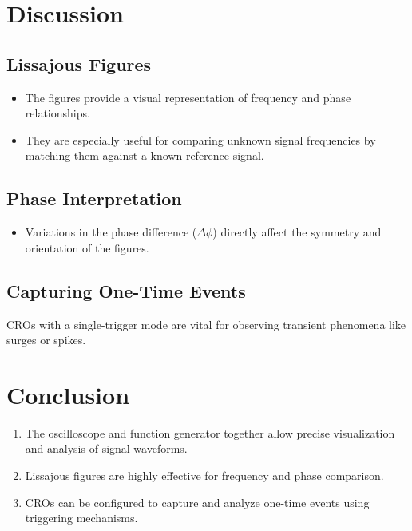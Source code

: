 \documentclass[a4paper,12pt]{article}
\begin{document}
\section*{\color{myblue}Discussion}

\subsection*{\color{mygreen}Lissajous Figures}
\begin{itemize}
    \item The figures provide a visual representation of frequency and phase relationships.
    \item They are especially useful for comparing unknown signal frequencies by matching them against a known reference signal.
\end{itemize}

\subsection*{\color{mygreen}Phase Interpretation}
\begin{itemize}
    \item Variations in the phase difference ($\Delta\phi$) directly affect the symmetry and orientation of the figures.
\end{itemize}

\subsection*{\color{mygreen}Capturing One-Time Events}
CROs with a single-trigger mode are vital for observing transient phenomena like surges or spikes.

\section*{\color{myblue}Conclusion}
\begin{enumerate}
    \item The oscilloscope and function generator together allow precise visualization and analysis of signal waveforms.
    \item Lissajous figures are highly effective for frequency and phase comparison.
    \item CROs can be configured to capture and analyze one-time events using triggering mechanisms.
\end{enumerate}
\end{document}
